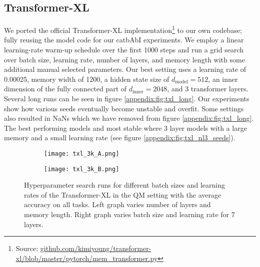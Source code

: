 \documentclass{article} \usepackage{iclr2021_conference,times}
\begin{document}
\subsection{Transformer-XL}
We ported the official Transformer-XL implementation\footnote{Source: \url{github.com/kimiyoung/transformer-xl/blob/master/pytorch/mem_transformer.py}} to our own codebase; fully reusing the model code for our catbAbI experiments. We employ a linear learning-rate warm-up schedule over the first 1000 steps and run a grid search over batch size, learning rate, number of layers, and memory length with some additional manual selected parameters. Our best setting uses a learning rate of 0.00025, memory width of 1200, a hidden state size of $d_\text{model}=512$, an inner dimension of the fully connected part of $d_\text{inner}=2048$, and 3 transformer layers. Several long runs can be seen in figure \ref{appendix:fig:txl_long}. Our experiments show how various seeds eventually become unstable and overfit. Some settings also resulted in NaNs which we have removed from figure \ref{appendix:fig:txl_long}. The best performing models and most stable where 3 layer models with a large memory and a small learning rate (see figure \ref{appendix:fig:txl_nl3_seeds}).
\begin{figure}[H]
  \centering
  \vspace{-10pt}
  \begin{subfigure}[b]{.49\linewidth}
    \texttt{[image: txl\_3k\_A.png]}
  \end{subfigure}
  \begin{subfigure}[b]{.49\linewidth}
    \texttt{[image: txl\_3k\_B.png]}
  \end{subfigure}
  \caption{Hyperparameter search runs for different batch sizes and learning rates of the Transformer-XL in the QM setting with the average accuracy on all tasks. Left graph varies number of layers and memory length. Right graph varies batch size and learning rate for 7 layers.}
  \label{appendix:fig:txl3k}
\end{figure}
\end{document}
